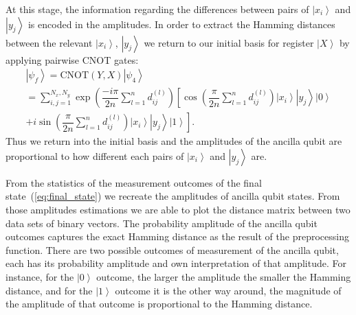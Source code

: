 \documentclass[pra,showkeys,twocolumn,showpacs,aps,10pt]{revtex4-2}
\begin{document}
At this stage, the information regarding the differences between pairs of $\left| x_i \right\rangle$ and $\left| y_j \right\rangle$ is encoded in the amplitudes. In order to extract the Hamming distances between the relevant $\left| x_i \right\rangle$, $\left| y_j \right\rangle$ we return to our initial basis for register $\left| X \right\rangle$ by applying pairwise CNOT gates:
%
\begin{multline}
    \label{eq:final_state}
    \left| \psi_f \right\rangle =
    \mathrm{CNOT} (Y,X)\left| \psi_4 \right\rangle \\=
    \sum\limits_{i, j=1}^{N_x,N_y}
    \exp \left(\dfrac{-i \pi}{2n}\sum\limits_{l=1}^n d^{(l)}_{ij} \right)
        \left[ \cos\left(\dfrac{\pi}{2n}\sum\limits_{l=1}^n d^{(l)}_{ij} \right)
        \left| x_i \right\rangle
        \left| y_j \right\rangle
        \left| 0 \right\rangle\right.
        \\+
        \left. i \sin\left(\dfrac{\pi}{2n}\sum\limits_{l=1}^n d^{(l)}_{ij} \right)
        \left| x_i \right\rangle
        \left| y_j \right\rangle
        \left| 1 \right\rangle\right] .
\end{multline}
%
Thus we return into the initial basis and the amplitudes of the ancilla qubit are proportional to how different each pairs of $\left| x_i \right\rangle$ and $\left| y_j \right\rangle$ are.





From the statistics of the measurement outcomes of the final state~(\ref{eq:final_state}) we recreate the amplitudes of ancilla qubit states.
From those amplitudes estimations we are able to plot the distance matrix between two data sets of binary vectors.
The probability amplitude of the ancilla qubit outcomes captures the exact Hamming distance as the result of the preprocessing function.
There are two possible outcomes of measurement of the ancilla qubit, each has its probability amplitude and own interpretation of that amplitude.
For instance, for the $\left| 0 \right\rangle$ outcome, the larger the amplitude the smaller the Hamming distance,
and for the $\left| 1 \right\rangle$ outcome it is the other way around, the magnitude of the amplitude of that outcome is proportional to the Hamming distance.
\end{document}
